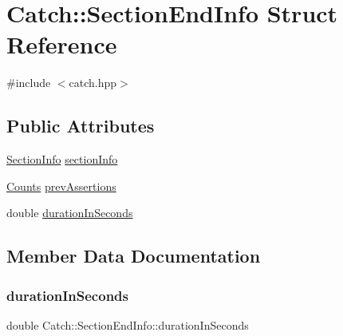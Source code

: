 \hypertarget{struct_catch_1_1_section_end_info}{}\section{Catch\+:\+:Section\+End\+Info Struct Reference}
\label{struct_catch_1_1_section_end_info}


{\ttfamily \#include $<$catch.\+hpp$>$}

\subsection*{Public Attributes}
\begin{DoxyCompactItemize}
\item 
\mbox{\hyperlink{struct_catch_1_1_section_info}{Section\+Info}} \mbox{\hyperlink{struct_catch_1_1_section_end_info_a2d44793392cb83735d086d726822abe9}{section\+Info}}
\item 
\mbox{\hyperlink{struct_catch_1_1_counts}{Counts}} \mbox{\hyperlink{struct_catch_1_1_section_end_info_ae70b154cbc05b5dd2901d97f89303d8c}{prev\+Assertions}}
\item 
double \mbox{\hyperlink{struct_catch_1_1_section_end_info_a7c262f2dab9cff166b8eca620c47eea5}{duration\+In\+Seconds}}
\end{DoxyCompactItemize}


\subsection{Member Data Documentation}
\mbox{\label{struct_catch_1_1_section_end_info_a7c262f2dab9cff166b8eca620c47eea5}} 
\subsubsection{\texorpdfstring{duration\+In\+Seconds}{durationInSeconds}}
{\footnotesize\ttfamily double Catch\+::\+Section\+End\+Info\+::duration\+In\+Seconds}

\mbox{\label{struct_catch_1_1_section_end_info_ae70b154cbc05b5dd2901d97f89303d8c}} 
